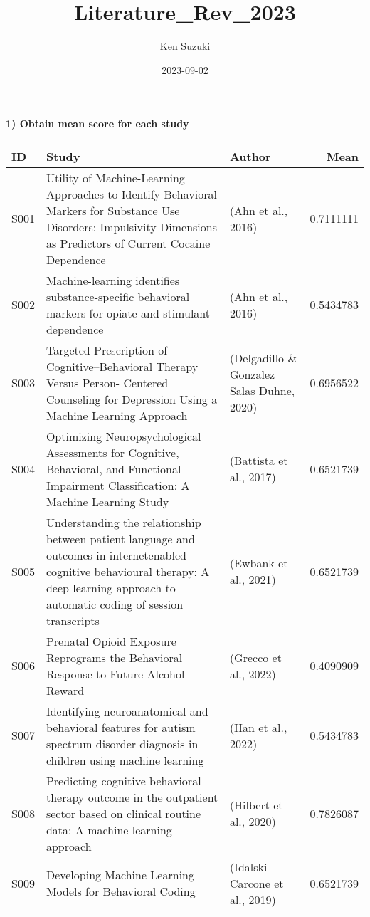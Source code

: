 \documentclass[
]{article}
\title{Literature\_Rev\_2023}
\author{Ken Suzuki}
\date{2023-09-02}
\begin{document}
\maketitle

\hypertarget{obtain-mean-score-for-each-study}{%
\paragraph{1) Obtain mean score for each
study}\label{obtain-mean-score-for-each-study}}

\begin{longtable}{lllr}
\toprule
ID & Study & Author & Mean \\ 
\midrule
S001 & Utility of Machine-Learning Approaches to Identify Behavioral Markers for Substance Use Disorders: Impulsivity Dimensions as Predictors of Current Cocaine Dependence & (Ahn et al., 2016) & 0.7111111 \\ 
S002 & Machine-learning identifies substance-specific behavioral markers for opiate and stimulant dependence & (Ahn et al., 2016) & 0.5434783 \\ 
S003 & Targeted Prescription of Cognitive–Behavioral Therapy Versus Person-
Centered Counseling for Depression Using a Machine Learning Approach & (Delgadillo \& Gonzalez Salas Duhne, 2020) & 0.6956522 \\ 
S004 & Optimizing Neuropsychological Assessments for Cognitive, Behavioral, and Functional Impairment Classification: 
A Machine Learning Study & (Battista et al., 2017) & 0.6521739 \\ 
S005 & Understanding the relationship between patient language and outcomes in internetenabled cognitive behavioural therapy: A deep learning approach to automatic coding of session transcripts & (Ewbank et al., 2021) & 0.6521739 \\ 
S006 & Prenatal Opioid Exposure Reprograms the Behavioral Response to Future Alcohol Reward & (Grecco et al., 2022) & 0.4090909 \\ 
S007 & Identifying neuroanatomical and behavioral features for autism spectrum disorder diagnosis in children using machine learning & (Han et al., 2022) & 0.5434783 \\ 
S008 & Predicting cognitive behavioral therapy outcome in the outpatient sector based on clinical routine data: A machine learning approach & (Hilbert et al., 2020) & 0.7826087 \\ 
S009 & Developing Machine Learning Models for Behavioral Coding & (Idalski Carcone et al., 2019) & 0.6521739 \\ 

\end{longtable}
\end{document}
